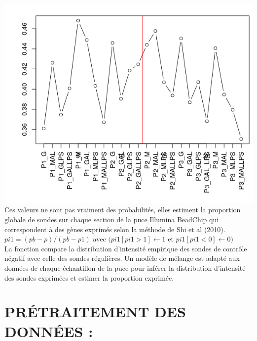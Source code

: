 \documentclass[a4paper,10pt]{article}
\begin{document}
\begin{center}
 \includegraphics[scale=0.5]{../../R/output/propexpr.png}
 Ces valeurs ne sont pas vraiment des probabilités, elles estiment la proportion globale de sondes sur chaque section de la puce Illumina BeadChip qui correspondent à des gènes exprimés selon la méthode de Shi et al (2010).
 $pi1= (pb-p)/(pb-p1) $ avec $(pi1[pi1 > 1] \leftarrow 1 $ et $pi1[pi1 < 0] \leftarrow 0)$\\
 La fonction compare la distribution d’intensité empirique des sondes de contrôle négatif avec celle des sondes régulières. 
 Un modèle de mélange est adapté aux données de chaque échantillon de la puce pour inférer la distribution d’intensité des sondes exprimées et estimer la proportion exprimée.
\end{center}

\section{PR\'{E}TRAITEMENT DES DONN\'{E}ES :}
\end{document}
